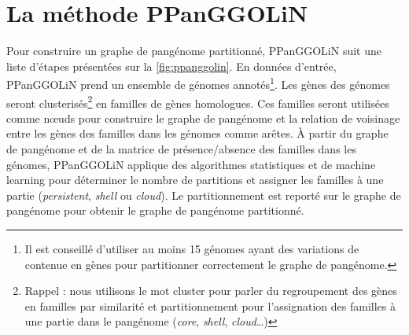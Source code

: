 \section{La méthode PPanGGOLiN}

Pour construire un graphe de pangénome partitionné, PPanGGOLiN suit une liste d'étapes présentées sur la \autoref{fig:ppanggolin}. En données d'entrée, PPanGGOLiN prend un ensemble de génomes annotés\footnote{Il est conseillé d'utiliser au moins 15 génomes ayant des variations de contenue en gènes pour partitionner correctement le graphe de pangénome.}. Les gènes des génomes seront clusterisés\footnote{Rappel : nous utilisons le mot cluster pour parler du regroupement des gènes en familles par similarité et partitionnement pour l'assignation des familles à une partie dans le pangénome (\textit{core}, \textit{shell}, \textit{cloud}\dots)} en familles de gènes homologues. Ces familles seront utilisées comme n\oe uds pour construire le graphe de pangénome et la relation de voisinage entre les gènes des familles dans les génomes comme arêtes. À partir du graphe de pangénome et de la matrice de présence/absence des familles dans les génomes, PPanGGOLiN applique des algorithmes statistiques et de machine learning pour déterminer le nombre de partitions et assigner les familles à une partie (\textit{persistent}, \textit{shell} ou \textit{cloud}). Le partitionnement est reporté sur le graphe de pangénome pour obtenir le graphe de pangénome partitionné.

